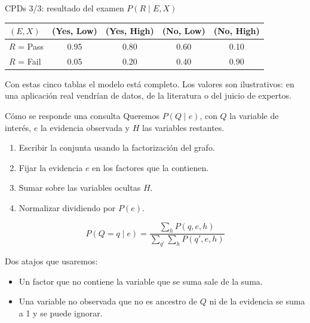 \documentclass[11pt]{beamer}
\newcommand{\Pp}[1]{P\!\left(#1\right)}
\begin{document}
\begin{frame}{CPDs 3/3: resultado del examen}
  \small
  \textbf{$\Pp{R\mid E,X}$}\\[0.1cm]
  \begin{tabular}{lcccc}
    \toprule
    $(E,X)$ & (Yes, Low) & (Yes, High) & (No, Low) & (No, High) \\
    \midrule
    $R$ = Pass & 0.95 & 0.80 & 0.60 & 0.10 \\
    $R$ = Fail & 0.05 & 0.20 & 0.40 & 0.90 \\
    \bottomrule
  \end{tabular}

  \vspace{0.4cm}
  \normalsize
  Con estas cinco tablas el modelo está completo. Los valores son ilustrativos: en una aplicación real vendrían de datos, de la literatura o del juicio de expertos.
\end{frame}

\begin{frame}{Cómo se responde una consulta}
  Queremos $\Pp{Q\mid e}$, con $Q$ la variable de interés, $e$ la evidencia observada y $H$ las variables restantes.

  \begin{enumerate}
    \item Escribir la conjunta usando la factorización del grafo.
    \item Fijar la evidencia $e$ en los factores que la contienen.
    \item Sumar sobre las variables ocultas $H$.
    \item Normalizar dividiendo por $\Pp{e}$.
  \end{enumerate}
  \[
    \Pp{Q=q\mid e}=\frac{\sum_{h}\Pp{q,e,h}}{\sum_{q'}\sum_{h}\Pp{q',e,h}}
  \]

  Dos atajos que usaremos:
  \begin{itemize}
    \item Un factor que no contiene la variable que se suma sale de la suma.
    \item Una variable no observada que no es ancestro de $Q$ ni de la evidencia se suma a 1 y se puede ignorar.
  \end{itemize}
\end{frame}
\end{document}
